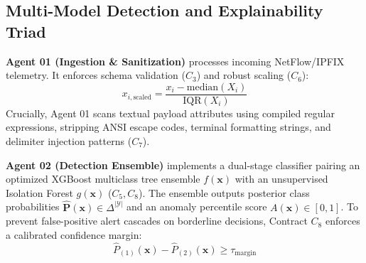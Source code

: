 \documentclass{ieeeaccess}
\begin{document}
\subsection{Multi-Model Detection and Explainability Triad}
\textbf{Agent 01 (Ingestion \& Sanitization)} processes incoming NetFlow/IPFIX telemetry. It enforces schema validation ($C_3$) and robust scaling ($C_6$):
\begin{equation}
x_{i, \text{scaled}} = \frac{x_i - \text{median}(X_i)}{\text{IQR}(X_i)}
\end{equation}
Crucially, Agent 01 scans textual payload attributes using compiled regular expressions, stripping ANSI escape codes, terminal formatting strings, and delimiter injection patterns ($C_7$).

\textbf{Agent 02 (Detection Ensemble)} implements a dual-stage classifier pairing an optimized XGBoost multiclass tree ensemble $f(\mathbf{x})$ with an unsupervised Isolation Forest $g(\mathbf{x})$ ($C_5, C_8$). The ensemble outputs posterior class probabilities $\hat{\mathbf{P}}(\mathbf{x}) \in \Delta^{|\mathcal{Y}|}$ and an anomaly percentile score $A(\mathbf{x}) \in [0, 1]$. To prevent false-positive alert cascades on borderline decisions, Contract $C_8$ enforces a calibrated confidence margin:
\begin{equation}
\hat{P}_{(1)}(\mathbf{x}) - \hat{P}_{(2)}(\mathbf{x}) \ge \tau_{\text{margin}}
\end{equation}
\end{document}
